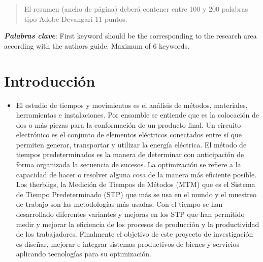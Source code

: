     \maketitle
    \thispagestyle{fancy}
    
    
    
    \begin{abstract}
    \noindent 
    El resumen (ancho de página) deberá contener entre 100 y 200 palabras tipo Adobe Devangari 11 puntos.
    
    \end{abstract}
    \textbf{\textit{Palabras clave}}: {First keyword should be the corresponding to the research area according with the authors guide. Maximum of 6 keywords.}
    
    \section{Introducción}
    
    \begin{itemize}
    \item El estudio de tiempos y movimientos es el análisis de métodos, materiales, herramientas e instalaciones.\cite{RAE}
    Por ensamble se entiende que es la colocación de dos o más piezas para la conformación de un producto final.\cite{RAE}
    Un circuito electrónico es el conjunto de elementos eléctricos conectados entre sí que permiten generar, transportar y utilizar la energía eléctrica.\cite{RAE}
    El método de tiempos predeterminados es la manera de determinar con anticipación de forma organizada la secuencia de sucesos.\cite{RAE} 
    La optimización se refiere a la capacidad de hacer o resolver alguna cosa de la manera más eficiente posible.\cite{RAE}
    Los therbligs, la Medición de Tiempos de Métodos (MTM) que es el Sistema de Tiempo Predeterminado (STP) que más se usa en el mundo y el muestreo de trabajo son las metodologías más usadas. Con el tiempo se han desarrollado diferentes variantes y mejoras en los STP que han permitido medir y mejorar la eficiencia de los procesos de producción y la productividad de los trabajadores. Finalmente el objetivo de este proyecto de investigación es diseñar, mejorar e integrar sistemas productivos de bienes y servicios aplicando tecnologías para su optimización.
    \end{itemize}
    
